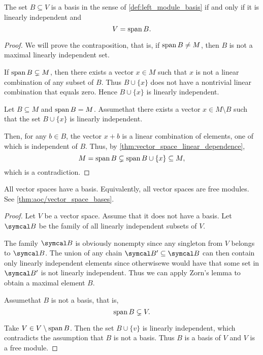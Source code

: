 \begin{proposition}\label{thm:vector_space_basis}
  The set \( B \subseteq V \) is a basis in the sense of \cref{def:left_module_basis} if and only if it is linearly independent and
  \begin{equation*}
    V = \operatorname{span}{B}.
  \end{equation*}
\end{proposition}
\begin{proof}
  \Implies We will prove the contraposition, that is, if \( \operatorname{span}{B} \neq M \), then \( B \) is not a maximal linearly independent set.

  If \( \operatorname{span}{B} \subsetneq M \), then there exists a vector \( x \in M \) such that \( x \) is not a linear combination of any subset of \( B \). Thus \( B \cup \{ x \} \) does not have a nontrivial linear combination that equals zero. Hence \( B \cup \{ x \} \) is linearly independent.

  \ImpliedBy Let \( B \subseteq M \) and \( \operatorname{span}{B} = M \). Assume\LEM that there exists a vector \( x \in M \setminus B \) such that the set \( B \cup \{ x \} \) is linearly independent.

  Then, for any \( b \in B \), the vector \( x + b \) is a linear combination of elements, one of which is independent of \( B \). Thus, by \cref{thm:vector_space_linear_dependence},
  \begin{equation*}
    M = \operatorname{span}{B} \subsetneq \operatorname{span}{B \cup \{ x \}} \subseteq M,
  \end{equation*}
  which is a contradiction.
\end{proof}

\begin{theorem}\label{thm:all_vector_spaces_are_free_left_modules}
  All vector spaces have a basis. Equivalently, all vector spaces are free modules. See \cref{thm:aoc/vector_space_bases}.
\end{theorem}
\begin{proof}
  Let \( V \) be a vector space. Assume that it does not have a basis. Let \( \Cal{B} \) be the family of all linearly independent subsets of \( V \).

  The family \( \Cal{B} \) is obviously nonempty since any singleton from \( V \) belongs to \( \Cal{B} \). The union of any chain \( \Cal{B}' \subseteq \Cal{B} \) can then contain only linearly independent elements since otherwise\LEM we would have that some set in \( \Cal{B}' \) is not linearly independent. Thus we can apply Zorn's lemma to obtain a maximal element \( B \).

  Assume\LEM that \( B \) is not a basis, that is,
  \begin{equation*}
    \operatorname{span} B \subsetneq V.
  \end{equation*}

  Take \( V \in V \setminus \operatorname{span} B \). Then the set \( B \cup \{ v \} \) is linearly independent, which contradicts the assumption that \( B \) is not a basis. Thus \( B \) is a basis of \( V \) and \( V \) is a free module.
\end{proof}

